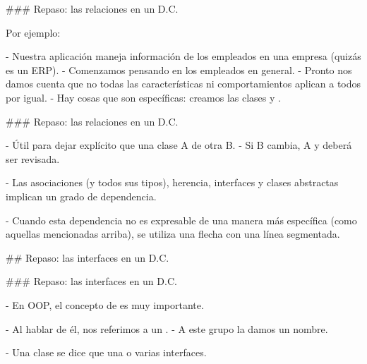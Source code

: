 
### Repaso: las relaciones en un D.C.


Por ejemplo:

- Nuestra aplicación maneja información de los empleados en una empresa (quizás es un ERP).
    - Comenzamos pensando en los empleados en general.
    - Pronto nos damos cuenta que no todas las características ni comportamientos aplican
    a todos por igual.
    - Hay cosas que son específicas: creamos las clases  y .


### Repaso: las relaciones en un D.C.


- Útil para dejar explícito que una clase A  de otra B.
    - Si B cambia, A  y deberá ser revisada.

- Las asociaciones (y todos sus tipos), herencia, interfaces y clases abstractas implican
un grado de dependencia.

- Cuando esta dependencia no es expresable de una manera más específica (como aquellas mencionadas arriba),
se utiliza una flecha con una línea segmentada.


## Repaso: las interfaces en un D.C.

### Repaso: las interfaces en un D.C.


- En OOP, el concepto de  es muy importante.

- Al hablar de él, nos referimos a un .
    - A este grupo la damos un nombre.

- Una clase se dice que  una o varias interfaces.

